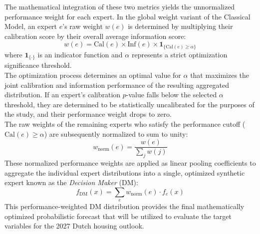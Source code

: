 The mathematical integration of these two metrics yields the unnormalized performance weight for each expert. In the global weight variant of the Classical Model, an expert $e$'s raw weight $w(e)$ is determined by multiplying their calibration score by their overall average information score:
\[
w(e) = \text{Cal}(e) \times \text{Inf}(e) \times \mathbf{1}_{\{\text{Cal}(e) \ge \alpha\}}
\]
where $\mathbf{1}_{\{\cdot\}}$ is an indicator function and $\alpha$ represents a strict optimization significance threshold.\\\newline
The optimization process determines an optimal value for $\alpha$ that maximizes the joint calibration and information performance of the resulting aggregated distribution. If an expert's calibration $p$-value falls below the selected $\alpha$ threshold, they are determined to be statistically uncalibrated for the purposes of the study, and their performance weight drops to zero.\\\newline
The raw weights of the remaining experts who satisfy the performance cutoff ($\text{Cal}(e) \ge \alpha$) are subsequently normalized to sum to unity:
\[
w_{\text{norm}}(e) = \frac{w(e)}{\sum_{j} w(j)}
\]
These normalized performance weights are applied as linear pooling coefficients to aggregate the individual expert distributions into a single, optimized synthetic expert known as the \textit{Decision Maker} (DM):
\[
f_{\text{DM}}(x) = \sum_{e} w_{\text{norm}}(e) \cdot f_e(x)
\]
This performance-weighted DM distribution provides the final mathematically optimized probabilistic forecast that will be utilized to evaluate the target variables for the 2027 Dutch housing outlook.
